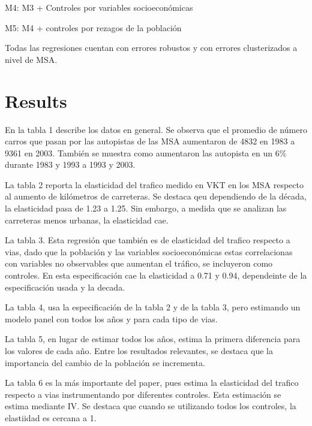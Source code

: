 \documentclass[
]{article}
\begin{document}
M4: M3 + Controles por variables socioeconómicas

M5: M4 + controles por rezagos de la población

Todas las regresiones cuentan con errores robustos y con errores
clusterizados a nivel de MSA.

\hypertarget{results}{%
\section{Results}\label{results}}

En la tabla 1 describe los datos en general. Se observa que el promedio
de número carros que pasan por las autopistas de las MSA aumentaron de
4832 en 1983 a 9361 en 2003. También se muestra como aumentaron las
autopista en un 6\% durante 1983 y 1993 a 1993 y 2003.



La tabla 2 reporta la elasticidad del trafico medido en VKT en los MSA
respecto al aumento de kilómetros de carreteras. Se destaca qeu
dependiendo de la década, la elasticidad pasa de 1.23 a 1.25. Sin
embargo, a medida que se analizan las carreteras menos urbanas, la
elasticidad cae.



La tabla 3. Esta regresión que también es de elasticidad del trafico
respecto a vias, dado que la población y las variables socioeconómicas
estas correlacionas con variables no observables que aumentan el
tráfico, se incluyeron como controles. En esta especificación cae la
elasticidad a 0.71 y 0.94, dependeinte de la especificación usada y la
decada.



La tabla 4, usa la especificación de la tabla 2 y de la tabla 3, pero
estimando un modelo panel con todos los años y para cada tipo de vias.



La tabla 5, en lugar de estimar todos los años, estima la primera
diferencia para los valores de cada año. Entre los resultados
relevantes, se destaca que la importancia del cambio de la población se
incrementa.



La tabla 6 es la más importante del paper, pues estima la elasticidad
del trafico respecto a vias instrumentando por diferentes controles.
Esta estimación se estima mediante IV. Se destaca que cuando se
utilizando todos los controles, la elastiidad es cercana a 1.
\end{document}
